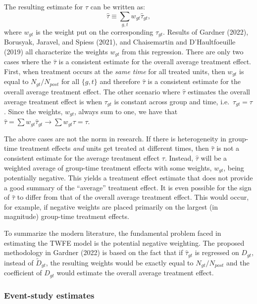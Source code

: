 The resulting estimate for \(\tau\) can be written as:
\[
\hat{\tau} \equiv \sum_{g,t} w_{gt} \hat{\tau}_{gt},
\]
where \(w_{gt}\) is the weight put on the corresponding \(\hat{\tau}_{gt}\). Results of Gardner (2022), Borusyak, Jaravel, and Spiess (2021), and Chaisemartin and D'Haultfoeuille (2019) all characterize the weights \(w_{gt}\) from this regression. There are only two cases where the \(\hat{\tau}\) is a consistent estimate for the overall average treatment effect. First, when treatment occurs at the \emph{same time} for all treated units, then \(w_{gt}\) is equal to \(N_{gt}/N_{post}\) for all \(\{g, t\}\) and therefore \(\hat{\tau}\) is a consistent estimate for the overall average treatment effect. The other scenario where \(\hat{\tau}\) estimates the overall average treatment effect is when \(\tau_{gt}\) is constant across group and time, i.e.~\(\tau_{gt} = \tau\). Since the weights, \(w_{gt}\), always sum to one, we have that \(\hat{\tau} = \sum w_{gt} \hat{\tau}_{gt} \to \sum w_{gt} \tau = \tau\).

The above cases are not the norm in research. If there is heterogeneity in group-time treatment effects \emph{and} units get treated at different times, then \(\hat{\tau}\) is not a consistent estimate for the average treatment effect \(\tau\). Instead, \(\hat{\tau}\) will be a weighted average of group-time treatment effects with some weights, \(w_{gt}\), being potentially negative. This yields a treatment effect estimate that does not provide a good summary of the ``average'' treatment effect. It is even possible for the sign of \(\hat{\tau}\) to differ from that of the overall average treatment effect. This would occur, for example, if negative weights are placed primarily on the largest (in magnitude) group-time treatment effects.

To summarize the modern literature, the fundamental problem faced in estimating the TWFE model is the potential negative weighting. The proposed methodology in Gardner (2022) is based on the fact that if \(\hat{\tau}_{gt}\) is regressed on \(D_{gt}\), instead of \(\tilde{D}_{gt}\), the resulting weights would be exactly equal to \(N_{gt}/N_{post}\) and the coefficient of \(D_{gt}\) would estimate the overall average treatment effect.

\hypertarget{event-study-estimates}{%
\subsubsection{Event-study estimates}\label{event-study-estimates}}

